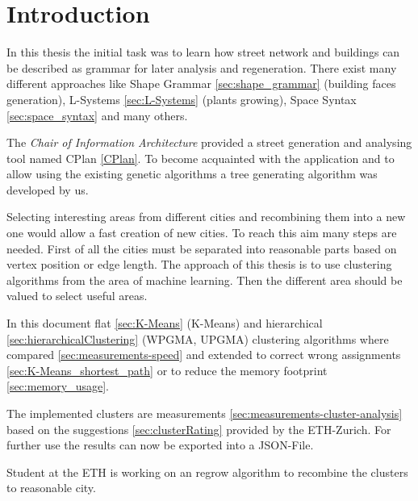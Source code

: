 \chapter{Introduction}
In this thesis the initial task was to learn how street network and buildings can be described as grammar for later analysis and regeneration. There exist many different approaches like Shape Grammar \ref{sec:shape_grammar} (building faces generation), L-Systems \ref{sec:L-Systems} (plants growing), Space Syntax \ref{sec:space_syntax} and many others. 

The \textit{Chair of Information Architecture} provided a street generation and analysing tool named CPlan \ref{CPlan}. To become acquainted with the application and to allow using the existing genetic algorithms a tree generating algorithm was developed by us. 

Selecting interesting areas from different cities and recombining them into a new one would allow a fast creation of new cities. To reach this aim many steps are needed. First of all the cities must be separated into reasonable parts based on vertex position or edge length. The approach of this thesis is to use clustering algorithms from the area of machine learning. Then the different area should be valued to select useful areas.

In this document flat \ref{sec:K-Means} (K-Means) and hierarchical \ref{sec:hierarchicalClustering} (WPGMA, UPGMA) clustering algorithms where compared \ref{sec:measurements-speed} and extended to correct wrong assignments \ref{sec:K-Means_shortest_path} or to reduce the memory footprint \ref{sec:memory_usage}.

The implemented clusters are measurements \ref{sec:measurements-cluster-analysis} based on the suggestions \ref{sec:clusterRating} provided by the ETH-Zurich. For further use the results can now be exported into a JSON-File. %

Student at the ETH is working on an regrow algorithm to recombine the clusters to reasonable city.
